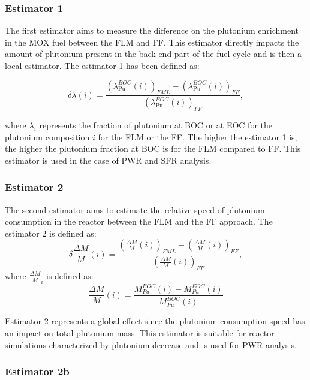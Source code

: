 \subsubsection{Estimator 1}
The first estimator aims to measure the difference on the plutonium enrichment in the MOX
fuel between the \gls{FLM} and \gls{FF}. This estimator directly impacts the amount of
plutonium present in the back-end part of the fuel cycle and is then a local estimator. The estimator 1 has been defined as:

\begin{equation}
    \delta{\lambda}(i) =
        \frac{\left(\lambda_{\mathrm{Pu}}^{BOC}(i)\right)_{FML}
              - \left(\lambda_{\mathrm{Pu}}^{BOC}(i)\right)_{FF}}
              {\left(\lambda_{\mathrm{Pu}}^{BOC}(i)\right)_{FF}},
\end{equation}

where $\lambda_i$ represents the fraction of plutonium at \gls{BOC} or at
\gls{EOC} for the plutonium composition $i$ for the \gls{FLM} or the \gls{FF}. The higher the estimator 1 is, the higher the plutonium fraction at \gls{BOC} is for the \gls{FLM} compared to \gls{FF}. This estimator is used in the case of \gls{PWR} and \gls{SFR} analysis.

\subsubsection{Estimator 2}

The second estimator aims to estimate the relative speed of plutonium consumption in the reactor between the \gls{FLM} and the \gls{FF} approach. The estimator 2 is defined as:
\begin{equation}
    \delta{\frac{\Delta M}{M}}(i) =
        \frac{\left(\frac{\Delta M}{M}(i)\right)_{FML}
              - \left(\frac{\Delta M}{M}(i)\right)_{FF}}
             {\left(\frac{\Delta M}{M}(i)\right)_{FF}},
\end{equation}
where $\frac{\Delta M}{M}_{i}$ is defined as:
\begin{equation}
    \frac{\Delta M}{M}(i) = \frac{M_{Pu}^{BOC}(i) -
    M_{Pu}^{EOC}(i)}{M_{Pu}^{BOC}(i)}
\end{equation}

Estimator 2 represents a global effect since the plutonium consumption speed has an impact on total plutonium mass. This estimator is suitable for reactor simulations characterized by plutonium decrease and is used for PWR analysis.

\subsubsection{Estimator 2b}






